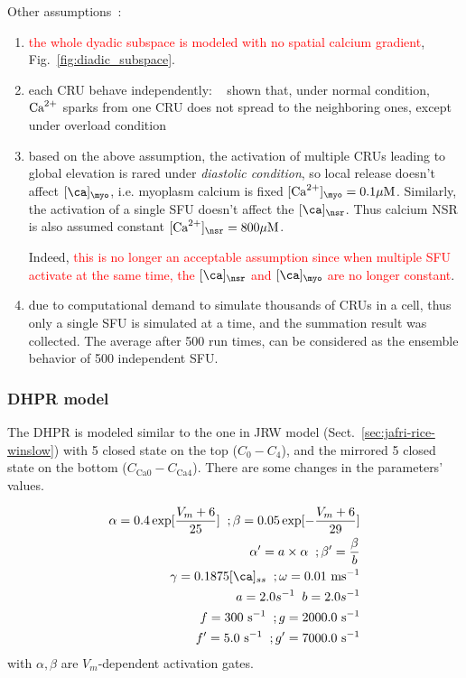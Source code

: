 Other assumptions~\citep{rice1999mgg}:
\begin{enumerate}

\item  \textcolor{red}{the whole dyadic subspace is modeled with no spatial
calcium gradient}, Fig.~\ref{fig:diadic_subspace}.

\item each CRU behave independently: ~\citep{cannell1995b,sham1998}
shown that, under normal condition,  ${\text{Ca}^{2+}}$ sparks from
one CRU does not spread to the neighboring  ones, except under overload
condition~\citep{cheng1996csc} 

\item based on the above assumption, the activation of multiple CRUs
  leading to global elevation is rared under
  {\it diastolic condition}, so local release doesn't affect
  $[\ca]_\myo$, i.e. myoplasm calcium is fixed $[\Ca]_\myo=0.1\muM$.
  Similarly, the activation of a single SFU doesn't affect the
  $[\ca]_\nsr$. Thus calcium NSR is also assumed constant
  $[\Ca]_\nsr=800\muM$.

  Indeed,
  \textcolor{red}{this is no longer an acceptable assumption since
    when multiple SFU activate at the same time, the $[\ca]_\nsr$
    and $[\ca]_\myo$ are no longer constant}.

\item due to computational demand to simulate thousands of CRUs in a
  cell, thus only a single SFU is simulated at a time, and the
  summation result was collected.  The average after 500 run times,
  can be considered as the ensemble behavior of 500 independent SFU.
\end{enumerate}

\subsubsection{DHPR model}
\label{sec:dhpr-model}


The DHPR is modeled similar to the one in JRW model
(Sect.~\ref{sec:jafri-rice-winslow}) with 5 closed state on the top
($C_0-C_4$), and the mirrored 5 closed state on the bottom
($C_{\text{Ca}0}-C_{\text{Ca}4}$). There are some changes in the
parameters' values.


\begin{equation}
  \label{eq:1029}
  \begin{split}
    \alpha = 0.4\exp[\frac{V_m+6}{25}] \;\;;
    \beta = 0.05 \exp[-\frac{V_m+6}{29}] \\
    \alpha'=a \times \alpha \;\;;
    \beta' = \frac{\beta}{b} \\
    \gamma = 0.1875 [\ca]_{ss} \;\;;
    \omega = 0.01 \text{ ms}^{-1} \\
    a=2.0 s^{-1} \;\; b = 2.0 s^{-1} \\
    f = 300 \text{ s}^{-1} \;\;;
    g = 2000.0 \text{ s}^{-1} \\
    f' = 5.0 \text{ s}^{-1} \;\;;
    g' = 7000.0 \text{ s}^{-1} \\
  \end{split}
\end{equation}
with $\alpha, \beta$ are $V_m$-dependent activation gates. 

